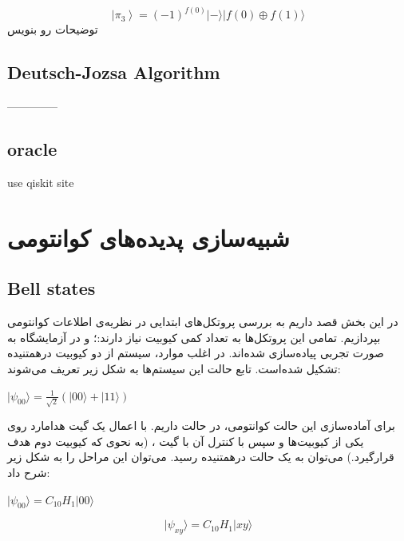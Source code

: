 \documentclass{book}
\begin{document}
$$
\left|\pi_3\right\rangle=(-1)^{f(0)}|-\rangle|f(0) \oplus f(1)\rangle
$$
توضیحات رو بنویس



\newpage

\section{Deutsch-Jozsa Algorithm}




--------------	
	
	
	
	
\section{oracle}
use qiskit site
\chapter{شبیه‌سازی پدیده‌های کوانتومی}
\section{Bell states}
در این بخش قصد داریم به بررسی پروتکل‌های ابتدایی در نظریه‌ی اطلاعات کوانتومی بپردازیم. تمامی این پروتکل‌ها به تعداد کمی کیوبیت نیاز دارند:؛ و در آزمایشگاه به صورت تجربی پیاده‌سازی شده‌اند. در اغلب موارد، سیستم از دو کیوبیت درهمتنیده تشکیل شده‌است. تابع حالت این سیستم‌ها به شکل زیر تعریف می‌شوند:
\begin{center}
	$\vert \psi_{00} \rangle = \frac{1}{\sqrt{2}}(|00\rangle + |11\rangle)$
\end{center}
برای آماده‌سازی این حالت کوانتومی‌، در حالت  داریم. با اعمال یک گیت هدامارد روی یکی از کیوبیت‌ها و سپس با کنترل‌ آن با گیت ، (به نحوی که کیوبیت دوم هدف قرارگیرد.) می‌توان به یک حالت درهمتنیده رسید. می‌توان این مراحل را به شکل زیر شرح داد:
\begin{center}
	$\vert\psi_{00}\rangle = C_{10}H_{1}\vert00\rangle$
\end{center}

\[
\vert\psi_{xy}\rangle = C_{10}H_{1}\vert xy \rangle
\]
\end{document}
